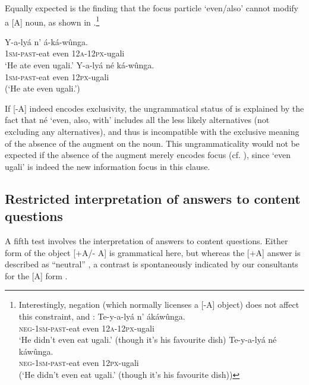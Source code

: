\documentclass[output=paper]{langsci/langscibook}
\begin{document}
Equally expected is the finding that the focus particle ‘even/also’ cannot modify a [A] noun, as shown in .\footnote{%
  Interestingly, negation (which normally licenses a [-A] object) does not affect this constraint, and :
    \ea 
      \ea 
      \gll Te-y-a-lyá    n’  ákáwûnga.\\
	\textsc{neg}-\textsc{1sm}-\textsc{past}-eat  even  \textsc{12a}-\textsc{12px}-ugali\\
      \glt   ‘He didn’t even eat ugali.’ (though it’s his favourite dish)
      \ex
      \gll *Te-y-a-lyá    né  káwûnga.\\
	\textsc{neg}-\textsc{1sm}-\textsc{past}-eat  even  \textsc{12px}-ugali\\
\glt	(‘He didn’t even eat ugali.’ (though it’s his favourite dish))
      \z
    \z
}

\ea\label{ex:vanderwal:32}
\ea\label{ex:vanderwal:32a}
\gll     Y-a-lyá    n’  á-ká-wûnga.\\
         \textsc{1sm}-\textsc{past}-eat  even  \textsc{12a}-\textsc{12px}-ugali\\
\glt     ‘He ate even ugali.’
\ex\label{ex:vanderwal:32b}
\gll     *Y-a-lyá    né  ká-wûnga.\\
         \textsc{1sm}-\textsc{past}-eat  even  \textsc{12px}-ugali\\
\glt     (‘He ate even ugali.’)
\z
\z

If [-A] indeed encodes exclusivity, the ungrammatical status of  is explained by the fact that né ‘even, also, with’ includes all the less likely alternatives (not excluding any alternatives), and thus is incompatible with the exclusive meaning of the absence of the augment on the noun. This ungrammaticality would not be expected if the absence of the augment merely encodes focus (cf. \citealt{HymanKatamba1993}), since ‘even ugali’ is indeed the new information focus in this clause.

\subsection{Restricted interpretation of answers to content questions}\label{sec:vanderwal:4.5} %

A fifth test involves the interpretation of answers to content questions. Either form of the object [+A/- A] is grammatical here, but whereas the [+A] answer is described as “neutral” , a contrast is spontaneously indicated by our consultants for the [A] form . 
\end{document}
